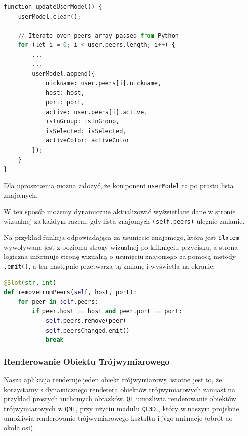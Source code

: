 \begin{lstlisting}[language=Python, caption={Slot w QML obsługujący wyświetlanie zmienionej listy znajomych}]
function updateUserModel() {
    userModel.clear();

    // Iterate over peers array passed from Python
    for (let i = 0; i < user.peers.length; i++) {
        ...
        ...
        userModel.append({
            nickname: user.peers[i].nickname,
            host: host,
            port: port,
            active: user.peers[i].active,
            isInGroup: isInGroup,
            isSelected: isSelected,
            activeColor: activeColor
        });
    }
}
\end{lstlisting}
Dla uproszczenia można założyć, że komponent \texttt{userModel} to po prostu lista znajomych.
\par
W ten sposób możemy dynamicznie aktualizować wyświetlane dane w stronie wizualnej za każdym razem, gdy lista znajomych \texttt{(self.peers)} ulegnie zmianie.

Na przykład funkcja odpowiadająca za usunięcie znajomego, która jest \texttt{Slotem} - wywoływana jest z poziomu strony wizualnej po kliknięciu przycisku, a strona logiczna informuje stronę wizualną o usunięciu znajomego za pomocą metody \texttt{.emit()}, a ten następnie przetwarza tą zmianę i wyświetla na ekranie:
\begin{lstlisting}[language=Python, caption={Przykładowe użycie sygnału dla listy znajomych}]
@Slot(str, int)
def removeFromPeers(self, host, port):
    for peer in self.peers:
        if peer.host == host and peer.port == port:
            self.peers.remove(peer)
            self.peersChanged.emit()
            break
\end{lstlisting}

\subsubsection{Renderowanie Obiektu Trójwymiarowego}
\label{sec:RenderowanieObiektuTrójwymiarowego}
Nasza aplikacja renderuje jeden obiekt trójwymiarowy, istotne jest to, że korzystamy z dynamicznego renderera obiektów trójwymiarowych zamiast na przykład prostych ruchomych obrazków.
\texttt{QT} umożliwia renderowanie obiektów trójwymiarowych w \texttt{QML}, przy użyciu modułu \texttt{Qt3D} \cite{QT3D}, który w naszym projekcie umożliwia renderowanie trójwymiarowego kształtu i jego animacje (obrót do okoła osi).

